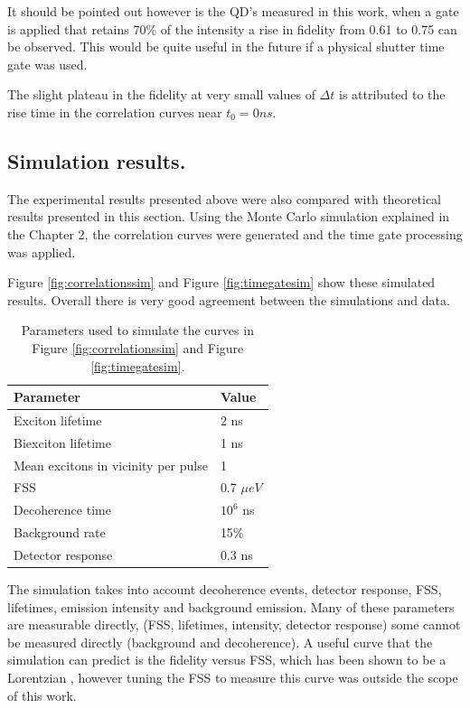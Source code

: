\documentclass[12pt, twoside]{article}
\numberwithin{equation}{section}
\begin{document}
It should be pointed out however is the QD's measured in this work, when
a gate is applied that retains 70\% of the intensity a rise in fidelity
from 0.61 to 0.75 can be observed. This would be quite useful in the
future if a physical shutter time gate was used.

The slight plateau in the fidelity at very small values of $\Delta t$ is
attributed to the rise time in the correlation curves near $t_0 = 0ns$.

\subsection{Simulation results.}\label{simulation-results.}

The experimental results presented above were also compared with
theoretical results presented in this section. Using the Monte Carlo
simulation explained in the Chapter 2, the correlation curves were
generated and the time gate processing was applied.

Figure \ref{fig:correlationssim} and Figure \ref{fig:timegatesim} show
these simulated results. Overall there is very good agreement between
the simulations and data.

\begin {table}[h]
\begin{center}
\begin{tabular}{ |l|l| }
  \hline
  \textbf{Parameter} & \textbf{Value} \\\hline
  Exciton lifetime & 2 ns \\\hline
  Biexciton lifetime & 1 ns \\\hline
  Mean excitons in vicinity per pulse & 1 \\\hline
  FSS & 0.7 $\mu eV$ \\\hline
  Decoherence time & $10^6$ ns \\\hline
  Background rate & 15\% \\\hline
  Detector response & 0.3 ns \\\hline
\end{tabular}
\caption{Parameters used to simulate the curves in Figure \ref{fig:correlationssim} and Figure \ref{fig:timegatesim}.}
\label{tab:paramstable}
\end{center}
\end {table}

The simulation takes into account decoherence events, detector response,
FSS, lifetimes, emission intensity and background emission. Many of
these parameters are measurable directly, (FSS, lifetimes, intensity,
detector response) some cannot be measured directly (background and
decoherence). A useful curve that the simulation can predict is the
fidelity versus FSS, which has been shown to be a Lorentzian
\cite{hudson}, however tuning the FSS to measure this curve was outside
the scope of this work.
\end{document}
